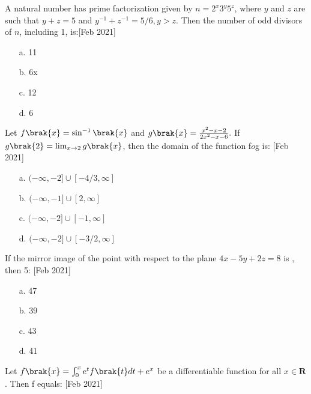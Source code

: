 
\iffalse
\title{Feb:2021}
\author{AI24BTECH11008}
\section{mcq-single}
\fi
\item A natural number has prime factorization given by $n = 2^x3^y5^z$, where $y$ and $z$ are such that $y + z = 5$ and $y^{-1} + z^{-1} = 5/6, y>z$. Then the number of odd divisors of $n$, including 1, is:\hfill [Feb 2021]
\begin{multicols}{2}
\begin{enumerate}
    \item [a.] 11
    \item [b.] 6x
	    \columnbreak
    \item [c.] 12
    \item [d.] 6   
\end{enumerate}
\end{multicols}
\item Let $f\brak{x} = \sin ^{-1} \brak{x}$ and $g\brak{x} = \frac{x^2-x-2}{2x^2-x-6}.$ If $g\brak{2} =\lim_{x\rightarrow2}g\brak{x}$, then the domain of the function f$o$g is: \hfill [Feb 2021]
\begin{multicols}{2}
\begin{enumerate}
    \item [a.] $(-\infty,-2]\cup[-4/3,\infty]$
    \item [b.] $(-\infty,-1]\cup[2,\infty]$
	    \columnbreak
    \item [c.] $(-\infty,-2]\cup[-1,\infty]$
    \item [d.] $(-\infty,-2]\cup[-3/2,\infty]$
\end{enumerate}
\end{multicols}
\item If the mirror image of the point  with respect to the plane $4x-5y+2z=8$ is \brak{\alpha,\beta,\gamma}, then
	5\brak{\alpha+\beta+\gamma}: \hfil [Feb 2021]
\begin{multicols}{2}
\begin{enumerate}
    \item [a.] 47
    \item [b.] 39
	    \columnbreak
    \item [c.] 43
    \item [d.] 41  
\end{enumerate}
\end{multicols}
\item Let $f\brak{x}=\int_0 ^x e^t f\brak{t}dt + e^x $ be a differentiable function for all $x\in \mathbf{R}$. Then f equals: \hfill [Feb 2021]
